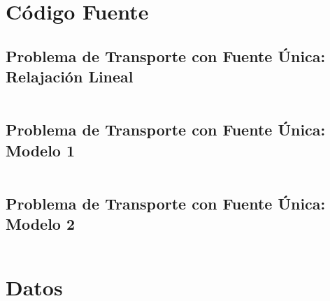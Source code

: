 \documentclass[a4paper, spanish]{article}
\begin{document}
  \begin{appendices}

    \section{Código Fuente}
    \label{appendix:source-code}

      \subsection{Problema de Transporte con Fuente Única: Relajación Lineal}
      \label{appendix:source-code-relaxation}

        \inputminted{text}{./../mosel/single-source-transportation-problem-relaxation.mos}

      \subsection{Problema de Transporte con Fuente Única: Modelo 1}
      \label{appendix:source-code-model-1}

        \inputminted{text}{./../mosel/single-source-transportation-problem-model-1.mos}

      \subsection{Problema de Transporte con Fuente Única: Modelo 2}
      \label{appendix:source-code-model-2}

        \inputminted{text}{./../mosel/single-source-transportation-problem-model-2.mos}

    \section{Datos}
    \label{appendix:data}

      \inputminted{text}{./../mosel/data.dat}

  \end{appendices}



  \nocite{subject:pent2017}
  \nocite{tool:xpress-mosel}
  \nocite{repository:network-flow-transeuro}

  
  
\end{document}
